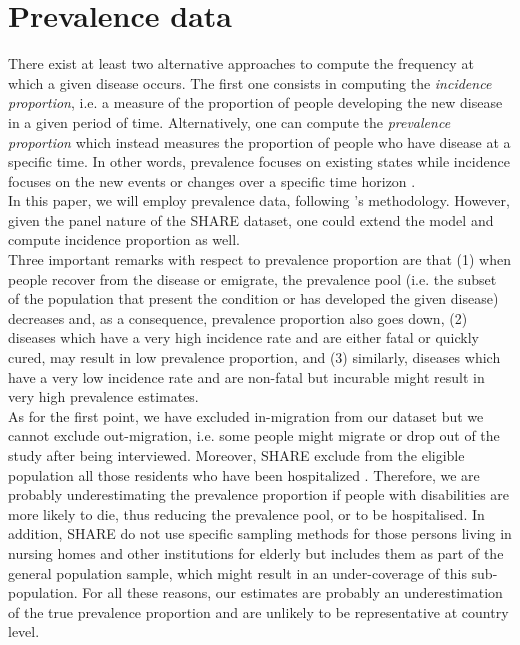 




\section{Prevalence data}

There exist at least two alternative approaches to compute the frequency at which a given disease occurs. The first one consists in computing the \textit{incidence proportion}, i.e. a measure of the proportion of people developing the new disease in a given period of time. Alternatively, one can compute the \textit{prevalence proportion} which instead measures the proportion of people who have disease at a specific time. In other words, prevalence focuses on existing states while incidence focuses on the new events or changes over a specific time horizon \citep{Rothman2008ModernEpidemiology}.\\


In this paper, we will employ prevalence data, following \cite{Caswell2018}'s methodology. However, given the panel nature of the SHARE dataset, one could extend the model and compute incidence proportion as well. \\

Three important remarks with respect to prevalence proportion are that (1) 
when people recover from the disease or emigrate, the prevalence pool (i.e. the subset of the population that present the condition or has developed the given disease) decreases and, as a consequence, prevalence proportion also goes down, (2) diseases which have a very high incidence rate and are either fatal or quickly cured, may result in low prevalence proportion, and (3) similarly, diseases which have a very low incidence rate and are non-fatal but incurable might result in very high prevalence estimates. \\


As for the first point, we have excluded in-migration from our dataset but we cannot exclude out-migration, i.e. some people might migrate or drop out of the study after being interviewed. Moreover, SHARE exclude from the eligible population all those residents who have been hospitalized \citep{Bergmann2017}. Therefore, we are probably underestimating the prevalence proportion if people with disabilities are more likely to die, thus reducing the prevalence pool, or to be hospitalised. In addition, SHARE do not use specific sampling methods for those persons living in nursing homes and other institutions for elderly but includes them as part of the general population sample, which might result in an
under-coverage of this sub-population. 
For all these reasons, our estimates are probably an underestimation of the true prevalence proportion and are unlikely to be representative at country level.\\

